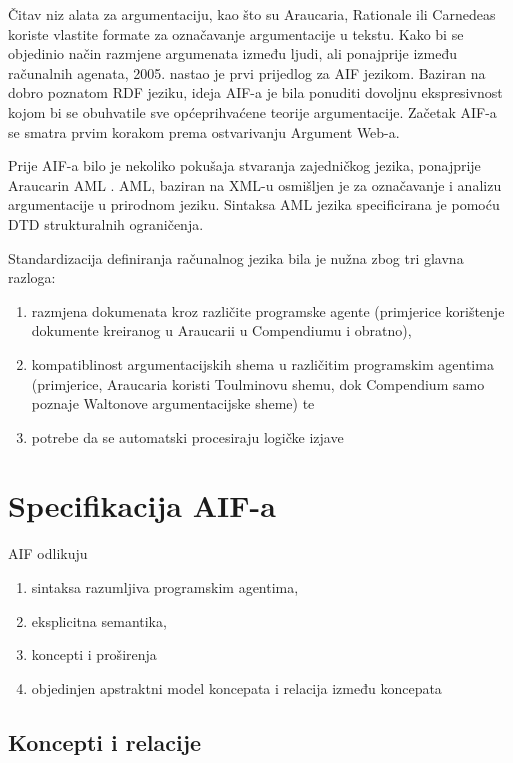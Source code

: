 Čitav niz alata za argumentaciju, kao što su Araucaria, Rationale ili Carnedeas
koriste vlastite formate za označavanje argumentacije u tekstu. Kako bi se
objedinio način razmjene argumenata između ljudi, ali ponajprije između
računalnih agenata, 2005. nastao je prvi prijedlog za AIF  jezikom. Baziran na dobro poznatom RDF jeziku, ideja AIF-a
je bila ponuditi dovoljnu ekspresivnost kojom bi se obuhvatile sve
općeprihvaćene teorije argumentacije. Začetak AIF-a se smatra prvim korakom
prema ostvarivanju Argument Web-a. 

Prije AIF-a bilo je nekoliko pokušaja stvaranja zajedničkog jezika, ponajprije
Araucarin AML . AML, baziran na XML-u
 osmišljen je za označavanje i analizu
argumentacije u prirodnom jeziku. Sintaksa AML jezika specificirana je pomoću
DTD  strukturalnih ograničenja.  

Standardizacija definiranja računalnog jezika bila je nužna zbog tri glavna razloga:
\begin{enumerate}
    \item razmjena dokumenata kroz različite programske agente (primjerice 
korištenje dokumente kreiranog u Araucarii u Compendiumu i obratno), 
    \item kompatiblinost argumentacijskih shema u različitim programskim agentima
(primjerice, Araucaria koristi Toulminovu shemu, dok Compendium samo poznaje 
Waltonove argumentacijske sheme) te 
    \item potrebe da se automatski procesiraju logičke izjave
\end{enumerate}

\section{Specifikacija AIF-a}

AIF odlikuju 
\begin{enumerate}
    \item sintaksa razumljiva programskim agentima,
    \item eksplicitna semantika,
    \item koncepti i proširenja 
    \item objedinjen apstraktni model koncepata i relacija između
koncepata
\end{enumerate}

\subsection{Koncepti i relacije}


